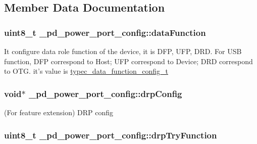 \subsection{Member Data Documentation}
\hypertarget{struct__pd__power__port__config_a5a3c023210ceec3faac6d13b0de58f75}{
\subsubsection[{data\-Function}]{\setlength{\rightskip}{0pt plus 5cm}uint8\-\_\-t \-\_\-pd\-\_\-power\-\_\-port\-\_\-config\-::data\-Function}}\label{struct__pd__power__port__config_a5a3c023210ceec3faac6d13b0de58f75}
It configure data role function of the device, it is D\-F\-P, U\-F\-P, D\-R\-D. For U\-S\-B function, D\-F\-P correspond to Host; U\-F\-P correspond to Device; D\-R\-D correspond to O\-T\-G. it's value is \hyperlink{group__usb__pd__stack_ga92476c6b5b34316ccb766c9d2cadd29e}{typec\-\_\-data\-\_\-function\-\_\-config\-\_\-t} \hypertarget{struct__pd__power__port__config_a95dc4dc28941f3a624bac60addc27b20}{
\subsubsection[{drp\-Config}]{\setlength{\rightskip}{0pt plus 5cm}void$\ast$ \-\_\-pd\-\_\-power\-\_\-port\-\_\-config\-::drp\-Config}}\label{struct__pd__power__port__config_a95dc4dc28941f3a624bac60addc27b20}
(For feature extension) D\-R\-P config \hypertarget{struct__pd__power__port__config_a6e72ee6532ef61497b162a28b4500433}{
\subsubsection[{drp\-Try\-Function}]{\setlength{\rightskip}{0pt plus 5cm}uint8\-\_\-t \-\_\-pd\-\_\-power\-\_\-port\-\_\-config\-::drp\-Try\-Function}}\label{struct__pd__power__port__config_a6e72ee6532ef61497b162a28b4500433}
